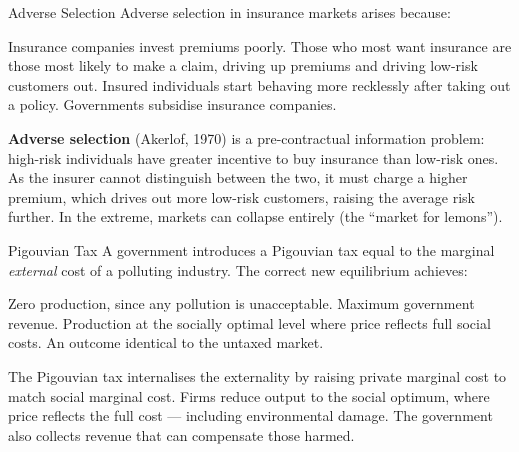 \documentclass[paper=a5]{scrartcl}
\begin{document}
\begin{question}[type=mc]{Adverse Selection}
Adverse selection in insurance markets arises because:
\begin{choices}
  \choice        Insurance companies invest premiums poorly.
  \correctchoice Those who most want insurance are those most likely to make a
                 claim, driving up premiums and driving low-risk customers out.
  \choice        Insured individuals start behaving more recklessly after
                 taking out a policy.
  \choice        Governments subsidise insurance companies.
\end{choices}
\begin{solution}
  \textbf{Adverse selection} (Akerlof, 1970) is a pre-contractual information
  problem: high-risk individuals have greater incentive to buy insurance than
  low-risk ones. As the insurer cannot distinguish between the two, it must
  charge a higher premium, which drives out more low-risk customers, raising
  the average risk further. In the extreme, markets can collapse entirely (the
  ``market for lemons'').
\end{solution}
\end{question}

\begin{question}[type=mc]{Pigouvian Tax}
A government introduces a Pigouvian tax equal to the marginal \emph{external}
cost of a polluting industry. The correct new equilibrium achieves:
\begin{choices}
  \choice        Zero production, since any pollution is unacceptable.
  \choice        Maximum government revenue.
  \correctchoice Production at the socially optimal level where price reflects
                 full social costs.
  \choice        An outcome identical to the untaxed market.
\end{choices}
\begin{solution}
  The Pigouvian tax internalises the externality by raising private marginal
  cost to match social marginal cost. Firms reduce output to the social
  optimum, where price reflects the full cost — including environmental damage.
  The government also collects revenue that can compensate those harmed.
\end{solution}
\end{question}
\end{document}
